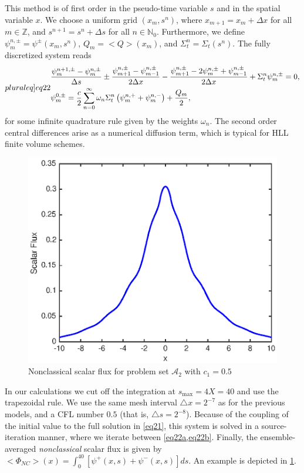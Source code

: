 \documentclass[12pt]{article}
\newcommand{\bl}{\big<}
\newcommand{\bg}{\big>}
\newcommand{\seta}{\mathcal{A}}
\begin{document}
{This method is of first order in the pseudo-time variable $s$ and in the spatial variable $x$.
We choose a uniform grid $(x_m,s^n)$, where $x_{m+1} = x_{m} + \Delta x$ for all $m\in\mathbb{Z}$, and $s^{n+1} = s^n + \Delta s$ for all $n\in\mathbb{N}_0$.
Furthermore, we define $\psi_{m}^{n,\pm}= \psi^\pm(x_{m},s^n)$, $Q_m = \bl Q\bg (x_m)$, and $\Sigma_t^n=\Sigma_t(s^n)$.
The fully discretized system reads
\begin{subequations}\label[pluraleq]{eq22}
\begin{align}
	& \frac{\psi^{n+1,\pm}_m-\psi^{n,\pm}_m}{\Delta s} \pm \frac{\psi^{n,\pm}_{m+1}-\psi_{m-1}^{n,\pm}}{2\Delta x} - 
			\frac{\psi^{n,\pm}_{m+1}-2\psi_m^{n,\pm}+\psi_{m-1}^{n,\pm}}{2\Delta x}   + \Sigma_t^n \psi^{n,\pm}_m = 0, \label{eq22a}\\
	&  \psi_m^{0,\pm} = \frac{c}{2}\sum\limits_{n=0}^\infty \omega_n \Sigma_t^n\left( \psi_m^{n,+} + \psi^{n,-}_m\right)  +  \frac{Q_m}{2},\label{eq22b}	
\end{align}
\end{subequations}
for some infinite quadrature rule given by the weights $\omega_n$.
The second order central differences arise as a numerical diffusion term, which is typical for HLL finite volume schemes.
\begin{figure}[htb]
  \centering
  \includegraphics[scale=1]{fig6.eps}
  \caption{Nonclassical scalar flux for problem set $\seta_2$ with $c_1=0.5$}
  \label{fig6}
\end{figure}

In our calculations we cut off the integration at $s_{\text{max}}=4X=40$ and use the trapezoidal rule.
We use the same mesh interval $\triangle x=2^{-7}$ as for the previous models, and a CFL number $0.5$ (that is, $\triangle s = 2^{-8}$). 
Because of the coupling of the initial value to the full solution in \cref{eq21}, this system is solved in a source-iteration manner, where we iterate between \cref{eq22a,eq22b}.
Finally, the ensemble-averaged {\em nonclassical} scalar flux is given by $\bl\Phi_{NC}\bg(x) = \int_0^{40}[\psi^+(x,s)+\psi^-(x,s)]ds$. An example is depicted in \cref{fig6}.

}
\end{document}
